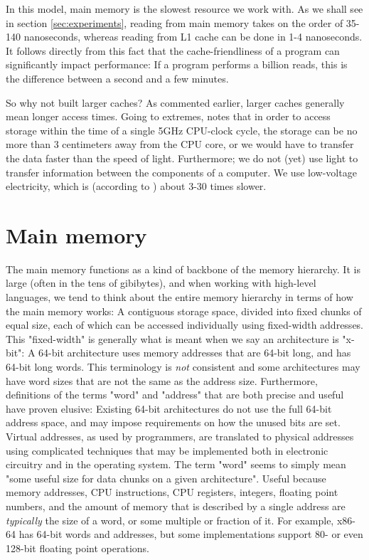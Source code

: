In this model, main memory is the slowest resource we work with. As we shall see
in section \ref{sec:experiments}, reading from main memory takes on the
order of 35-140 nanoseconds, whereas reading from L1 cache can be done in 1-4
nanoseconds. It follows directly from this fact that the cache-friendliness of a
program can significantly impact performance: If a program performs a billion
reads, this is the difference between a second and a few minutes.

So why not built larger caches? As commented earlier, larger caches generally
mean longer access times. Going to extremes, \citeauthor{mckenney} \cite{mckenney} notes that in order
to access storage within the time of a single 5GHz CPU-clock cycle, the storage
can be no more than 3 centimeters away from the CPU core, or we would have to
transfer the data faster than the speed of light. Furthermore; we do not (yet)
use light to transfer information between the components of a computer. We use
low-voltage electricity, which is (according to \cite{mckenney}) about 3-30
times slower.

\section{Main memory}
The main memory functions as a kind of backbone of the memory hierarchy. It is
large (often in the tens of gibibytes), and when working with high-level
languages, we tend to think about the entire memory
hierarchy in terms of how the main memory works: A contiguous storage space,
divided into fixed chunks of equal size, each of which can be
accessed individually using fixed-width addresses. This "fixed-width" is
generally what is meant when we say an architecture is "x-bit": A 64-bit
architecture uses memory addresses that are 64-bit long, and has 64-bit long
words. This terminology is \textit{not} consistent and some architectures may
have word sizes that are not the same as the address size. Furthermore,
definitions of the terms "word" and "address" that are both precise and useful
have proven elusive: Existing 64-bit architectures do not use the full 64-bit
address space, and may impose requirements on how the unused bits are set.
Virtual addresses, as used by programmers, are translated to physical addresses
using complicated techniques that may be implemented both in electronic circuitry and in
the operating system. The term "word" seems to simply mean "some useful size for
data chunks on a given architecture". Useful because memory addresses, CPU
instructions, CPU registers, integers, floating point numbers, and the amount of
memory that is described by a single address are \textit{typically} the size of
a word, or some multiple or fraction of it. For example, x86-64 has 64-bit words
and addresses, but some implementations support 80- or even 128-bit floating
point operations.

